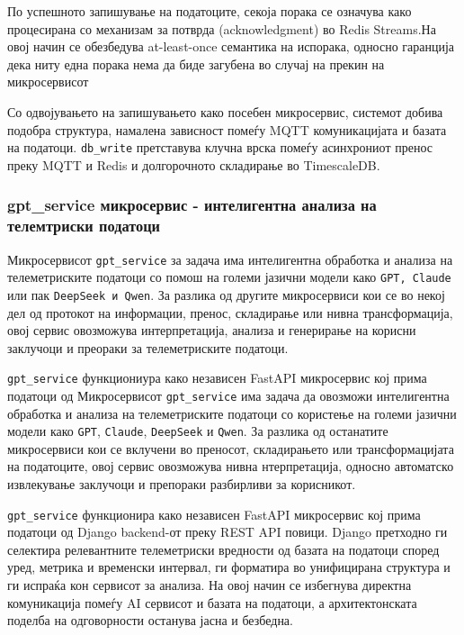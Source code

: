 По успешното запишување на податоците, секоја порака се означува како процесирана со механизам за потврда (acknowledgment) во Redis Streams.На овој начин се обезбедува at-least-once семантика на испорака, односно гаранција дека ниту една порака нема да биде загубена во случај на прекин на микросервисот

Со одвојувањето на запишувањето како посебен микросервис, системот добива подобра структура, намалена зависност помеѓу MQTT комуникацијата и базата на податоци. \texttt{db\_write} претставува клучна врска помеѓу асинхрониот пренос преку MQTT и Redis и долгорочното складирање во TimescaleDB.

\subsubsection{gpt\_service микросервис - интелигентна анализа на телемтриски податоци}

Микросервисот \texttt{gpt\_service} за задача има интелигентна обработка и анализа на телеметриските податоци со помош на големи јазични модели како \texttt{GPT, Claude} или пак \texttt{DeepSeek и Qwen}. За разлика од другите микросервиси кои се во некој дел од протокот на информации, пренос, складирање или нивна трансформација, овој сервис овозможува интерпретација, анализа и генерирање на корисни заклучоци и преораки за телеметриските податоци.

\texttt{gpt\_service} функциониура како независен FastAPI микросервис кој прима податоци од Микросервисот \texttt{gpt\_service} има задача да овозможи интелигентна обработка и анализа на телеметриските податоци со користење на големи јазични модели како \texttt{GPT}, \texttt{Claude}, \texttt{DeepSeek} и \texttt{Qwen}. За разлика од останатите микросервиси кои се вклучени во преносот, складирањето или трансформацијата на податоците, овој сервис овозможува нивна нтерпретација, односно автоматско извлекување заклучоци и препораки разбирливи за корисникот.

\texttt{gpt\_service} функционира како независен FastAPI микросервис кој прима податоци од Django backend-от преку REST API повици. Django претходно ги селектира релевантните телеметриски вредности од базата на податоци според уред, метрика и временски интервал, ги форматира во унифицирана структура и ги испраќа кон сервисот за анализа. На овој начин се избегнува директна комуникација помеѓу AI сервисот и базата на податоци, а архитектонската поделба на одговорности останува јасна и безбедна.

